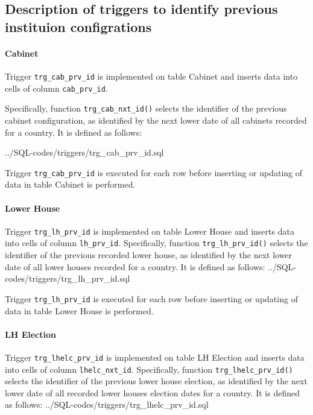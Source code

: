 \subsection{Description of triggers to identify previous instituion configrations}\label{subsec_appx_trigger_prv_ids}

\paragraph{Cabinet}\label{trg_cab_prv_id}
Trigger \texttt{trg\_cab\_prv\_id} is implemented on table Cabinet and inserts data into cells of column \texttt{cab\_prv\_id}. 

Specifically, function \texttt{trg\_cab\_nxt\_id()} selects the identifier of the previous cabinet configuration, as identified by the next lower date of all cabinets recorded for a country.
It is defined as follows:

%
{../SQL-codes/triggers/trg_cab_prv_id.sql}

Trigger \texttt{trg\_cab\_prv\_id} is executed for each row before inserting or updating of data in table Cabinet is performed. 

\paragraph{Lower House}\label{trg_lh_prv_id}
Trigger \texttt{trg\_lh\_prv\_id} is implemented on table Lower House and inserts data into cells of column \texttt{lh\_prv\_id}. 
Specifically, function \texttt{trg\_lh\_prv\_id()} selects the identifier of the previous recorded lower house, as identified by the next lower date of all lower houses recorded for a country.
It is defined as follows:
%
{../SQL-codes/triggers/trg_lh_prv_id.sql}

Trigger \texttt{trg\_lh\_prv\_id} is executed for each row before inserting or updating of data in table Lower House is performed. 


\paragraph{LH Election}\label{trg_lhelc_prv_id}
Trigger \texttt{trg\_lhelc\_prv\_id} is implemented on table LH Election and inserts data into cells of column \texttt{lhelc\_nxt\_id}. 
Specifically, function \texttt{trg\_lhelc\_prv\_id()} selects the identifier of the previous lower house election, as identified by the next lower date of all recorded lower houses election dates for a country.
It is defined as follows:
%
{../SQL-codes/triggers/trg_lhelc_prv_id.sql}


